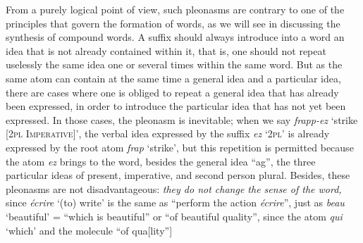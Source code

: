 \begin{sloppypar}
{    From a purely logical point of view, such pleonasms are contrary
    to one of the principles that govern the formation of words, as we
    will see in discussing the synthesis of compound words. A suffix
    should always introduce into a word an idea that is not already
    contained within it, that is, one should not repeat uselessly the
    same idea one or several times within the same word.  But as the
    same atom can contain at the same time a general idea and a
    particular idea, there are cases where one is obliged to repeat a
    general idea that has already been expressed, in order to
    introduce the particular idea that has not yet been expressed. In
    those cases, the pleonasm is inevitable; when we say
    \emph{frapp-ez} `strike {[\textsc{2pl Imperative]}}', the verbal
    idea expressed by the suffix \emph{ez} `\textsc{2pl}' is already
    expressed by the root atom \emph{frap} `strike', but this repetition
    is permitted because the atom \emph{ez} brings to the word, besides
    the general idea ``ag'', the three particular ideas of present,
    imperative, and second person plural. Besides, these pleonasms
    are not disadvantageous: \emph{they do not change the sense of the
      word,} since \emph{écrire} `(to) write' is the same as
    ``perform the action \emph{écrire}'', just as \emph{beau}
    `beautiful' = ``which is beautiful'' or ``of beautiful quality'',
    since the atom \emph{qui} `which' and the molecule ``of
    qua[lity''] }

\end{sloppypar}
